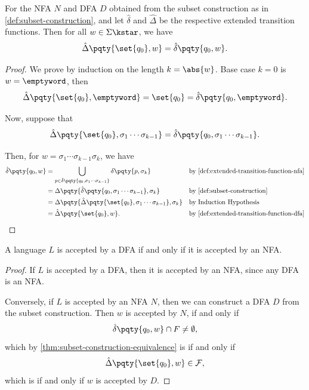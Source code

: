 \begin{theorem}
    \label{thm:subset-construction-equivalence}%
    For the NFA \(N\) and DFA \(D\) obtained from the subset construction as in \autoref{def:subset-construction}, and let \(\hat{\delta}\) and \(\hat{\Delta}\) be the respective extended transition functions. Then for all \(w \in \Sigma\kstar\), we have
    \[
        \hat{\Delta}\pqty{\set{q_0}, w} = \hat{\delta}\pqty{q_0, w}.
    \]
\end{theorem}

\begin{proof}
    We prove by induction on the length \(k = \abs{w}\). Base case \(k = 0\) is \(w = \emptyword\), then
    \[
        \hat{\Delta}\pqty{\set{q_0}, \emptyword} = \set{q_0} = \hat{\delta}\pqty{q_0, \emptyword}.
    \]

    Now, suppose that
    \[
        \hat{\Delta} \pqty{\set{q_0}, \sigma_1 \cdots \sigma_{k - 1}} = \hat{\delta}\pqty{q_0, \sigma_1 \cdots \sigma_{k - 1}}.
    \]

    Then, for \(w = \sigma_1 \cdots \sigma_{k - 1} \sigma_k\), we have
    \begin{align*}
        \hat{\delta} \pqty{q_0, w} &= \bigcup_{p \in \hat{\delta}\pqty{q_0, \sigma_1 \cdots \sigma_{k - 1}}} \delta\pqty{p, \sigma_k} && \text{by \autoref{def:extended-transition-function-nfa}}\\
        &= \Delta \pqty{\hat{\delta} \pqty{q_0, \sigma_1 \cdots \sigma_{k - 1}}, \sigma_k} && \text{by \autoref{def:subset-construction}}\\
        &= \Delta \pqty{\hat{\Delta} \pqty{\set{q_0}, \sigma_1 \cdots \sigma_{k - 1}}, \sigma_k} && \text{by Induction Hypothesis} \\
        &= \hat{\Delta} \pqty{\set{q_0}, w}. && \text{by \autoref{def:extended-transition-function-dfa}}
    \end{align*}
\end{proof}

\begin{corollary}
    A language \(L\) is accepted by a DFA if and only if it is accepted by an NFA.
\end{corollary}

\begin{proof}
    If \(L\) is accepted by a DFA, then it is accepted by an NFA, since any DFA is an NFA.
    
    Conversely, if \(L\) is accepted by an NFA \(N\), then we can construct a DFA \(D\) from the subset construction. Then \(w\) is accepted by \(N\), if and only if
    \[
        \hat{\delta} \pqty{q_0, w} \cap F \neq \emptyset,
    \]
    which by \autoref{thm:subset-construction-equivalence} is if and only if
    \[
        \hat{\Delta} \pqty{\set{q_0}, w} \in \mathcal{F},
    \]
    which is if and only if \(w\) is accepted by \(D\).
\end{proof}

